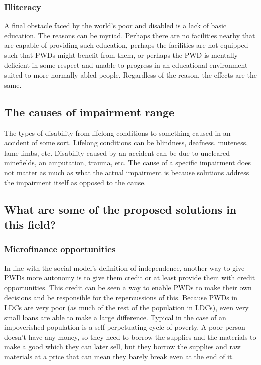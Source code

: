 \documentclass[a4paper]{article}
\begin{document}
\subsubsection{Illiteracy}

A final obstacle faced by the world’s poor and disabled is a lack of basic
education. The reasons can be myriad. Perhaps there are no facilities nearby
that are capable of providing such education, perhaps the facilities are not
equipped such that PWDs might benefit from them, or perhaps the PWD is
mentally deficient in some respect and unable to progress in an educational
environment suited to more normally-abled people. Regardless of the reason,
the effects are the same.


\subsection{The causes of impairment range }

The types of disability from lifelong conditions to something caused in an
accident of some sort. Lifelong conditions can be blindness, deafness,
muteness, lame limbs, etc. Disability caused by an accident can be due to
uncleared minefields, an amputation, trauma, etc. The cause of a specific
impairment does not matter as much as what the actual impairment is because
solutions address the impairment itself as opposed to the cause. 


\subsection{What are some of the proposed solutions in this field?}

\subsubsection{Microfinance opportunities}

In line with the social model's definition of independence, another way to
give PWDs more autonomy is to give them credit or at least provide them with
credit opportunities. This credit can be seen a way to enable PWDs to make
their own decisions and be responsible for the repercussions of this. Because
PWDs in LDCs are very poor (as much of the rest of the population in LDCs),
even very small loans are able to make a large difference. Typical in the case
of an impoverished population is a self-perpetuating cycle of poverty. A poor
person doesn't have any money, so they need to borrow the supplies and the
materials to make a good which they can later sell, but they borrow the
supplies and raw materials at a price that can mean they barely break even at
the end of it.
\end{document}
